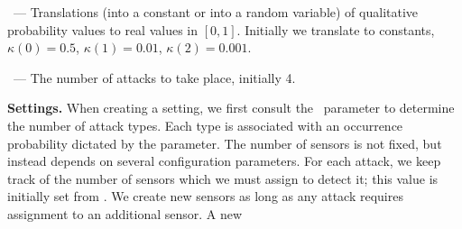 \begin{compactitem}
\item \kappaTranslations\ --- Translations (into a constant or into a
  random variable) of qualitative probability values to real values in
  $[0,1]$. Initially we translate to constants, $\kappa(0)=0.5$,
  $\kappa(1)=0.01$, $\kappa(2)=0.001$.
  

\item \numAttacks\ --- %
  The number of attacks to take place, %
  initially 4.


\end{compactitem}
%
%
%
%
\textbf{Settings.}
When creating a setting, we first consult
the \numAttacks\ parameter to determine the number of attack types.
Each type is associated with an
occurrence probability dictated by the 
\attackKappa parameter. The number of sensors is not fixed, but instead depends
on several configuration parameters. For each attack, we keep track of
the number of sensors which we must assign to detect it; this value is
initially set from \sensorToAttackRatio.  We create new sensors as
long as any attack requires assignment to an additional sensor. A new

